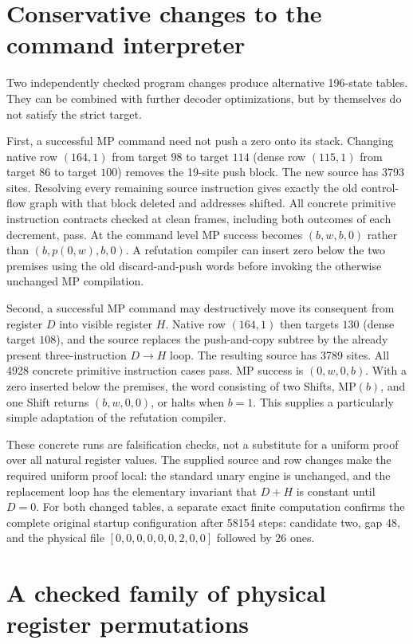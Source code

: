 \section{Conservative changes to the command interpreter}

Two independently checked program changes produce alternative
196-state tables. They can be combined with further decoder
optimizations, but by themselves do not satisfy the strict target.

First, a successful MP command need not push a zero onto its stack.
Changing native row $(164,1)$ from target $98$ to target $114$
(dense row $(115,1)$ from target $86$ to target $100$) removes the
19-site push block. The new source has 3793 sites. Resolving every
remaining source instruction gives exactly the old control-flow graph
with that block deleted and addresses shifted. All concrete primitive
instruction contracts checked at clean frames, including both outcomes
of each decrement, pass. At the command level MP success becomes
$(b,w,b,0)$ rather than $(b,p(0,w),b,0)$. A refutation compiler can
insert zero below the two premises using the old discard-and-push
words before invoking the otherwise unchanged MP compilation.

Second, a successful MP command may destructively move its consequent
from register $D$ into visible register $H$. Native row $(164,1)$ then
targets $130$ (dense target $108$), and the source replaces the
push-and-copy subtree by the already present three-instruction
$D\to H$ loop. The resulting source has 3789 sites. All 4928 concrete
primitive instruction cases pass. MP success is $(0,w,0,b)$.
With a zero inserted below the premises, the word consisting of two
Shifts, MP$(b)$, and one Shift returns $(b,w,0,0)$, or halts when
$b=1$. This supplies a particularly simple adaptation of the
refutation compiler.

These concrete runs are falsification checks, not a substitute for a
uniform proof over all natural register values. The supplied source
and row changes make the required uniform proof local: the standard
unary engine is unchanged, and the replacement loop has the elementary
invariant that $D+H$ is constant until $D=0$.
For both changed tables, a separate exact finite computation confirms
the complete original startup configuration after 58154 steps:
candidate two, gap 48, and the physical file
$[0,0,0,0,0,0,2,0,0]$ followed by 26 ones.

\section{A checked family of physical register permutations}


